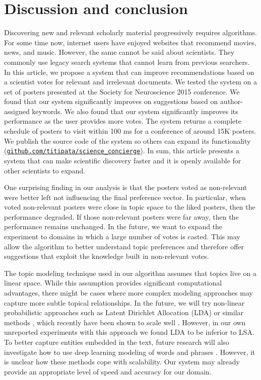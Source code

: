 \documentclass[a4paper]{article}
\begin{document}
\section{Discussion and conclusion}

Discovering new and relevant scholarly material progressively requires algorithms. For some time now, internet users have enjoyed websites that recommend movies, news, and music. However, the same cannot be said about scientists. They commonly use legacy search systems that cannot learn from previous searchers. In this article, we propose a system that can improve recommendations based on a scientist votes for relevant and irrelevant documents. We tested the system on a set of posters presented at the Society for Neuroscience 2015 conference. We found that our system significantly improves on suggestions based on author-assigned keywords. We also found that our system significantly improves its performance as the user provides more votes. The system returns a complete schedule of posters to visit within 100 ms for a conference of around 15K posters. We publish the source code of the system so others can expand its functionality (\href{https://github.com/titipata/science_concierge}{\texttt{github.com/titipata/science\_concierge}}). In sum, this article presents a system that can make scientific discovery faster and it is openly available for other scientists to expand.


One surprising finding in our analysis is that the posters voted as non-relevant were better left not influencing the final preference vector. In particular, when voted non-relevant posters were close in topic space to the liked posters, then the performance degraded. If those non-relevant posters were far away, then the performance remains unchanged. In the future, we want to expand the experiment to domains in which a large number of votes is casted. This may allow the algorithm to better understand topic preferences and therefore offer suggestions that exploit the knowledge built in non-relevant votes.


The topic modeling technique used in our algorithm assumes that topics live on a linear space. While this assumption provides significant computational advantages, there might be cases where more complex modeling approaches may capture more subtle topical relationships. In the future, we will try non-linear probabilistic approaches such as Latent Dirichlet Allocation (LDA) or similar methods \cite{blei2003latent, lancichinetti2015high}, which recently have been shown to scale well \cite{hoffman2010online}. However, in our own unreported experiments with this approach we found LDA to be inferior to LSA. To better capture entities embedded in the text, future research will also investigate how to use deep learning modeling of words and phrases \cite{mikolov2013efficient, pennington2014glove}. However, it is unclear how these methods cope with scalability. Our system may already provide an appropriate level of speed and accuracy for our domain.
\end{document}
